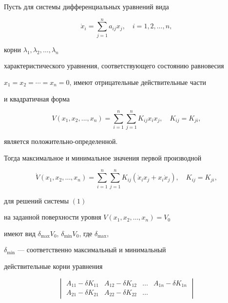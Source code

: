 \begin{thm}


Пусть для системы дифференциальных уравнений вида


\begin{equation}


\Dot x_{i}=\sum_{j=1}^{n} a_{ij}x_{j}, \quad i=1,2,\dotsc,n,


\end{equation}


корни $\lambda_{1},\lambda_{2},\dotsc,\lambda_{n}$


характеристического уравнения, соответствующего состоянию равновесия


$x_{1}=x_{2}=\dotsb =x_{n}=0$, имеют отрицательные действительные части


и квадратичная форма


\begin{equation}


V(x_{1},x_{2},\dotsc,x_{n})=\sum_{i=1}^{n} \sum_{j=1}^{n}K_{ij}x_{i}x_{j},


\quad K_{ij}=K_{ji},


\end{equation}


является положительно-определенной.


Тогда максимальное и минимальное значения первой производной


$$


\Dot V(x_{1},x_{2},\dotsc,x_{n})=\sum_{i=1}^{n} \sum_{j=1}^{n}K_{ij}


(\Dot x_{i}x_{j}+x_{i}\Dot x_{j}),\quad K_{ij}=K_{ji},


$$


для решений системы $(1)$


на заданной поверхности уровня $V(x_{1},x_{2},\dotsc,x_{n})=V_{0}$


имеют вид $\delta_{\max}V_{0}$, $\delta_{\min}V_{0}$, где $\delta_{\max}$,


$\delta_{\min}$ --- соответственно максимальный и минимальный 


действительные корни уравнения


\begin{equation}


\begin{vmatrix}


A_{11}-\delta K_{11} & A_{12}-\delta K_{12} & \dotsc &


A_{1n}-\delta K_{1n} \\


A_{21}-\delta K_{21} & A_{22}-\delta K_{22} & \dotsc &



\end{vmatrix}
\end{equation}
\end{thm}
